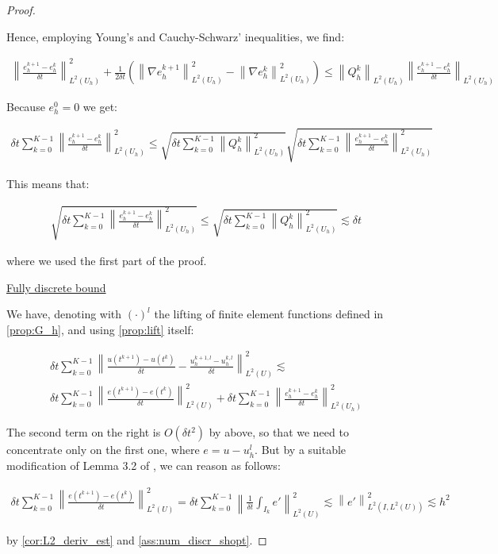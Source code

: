 \documentclass[english,a4paper,9pt,oneside]{scrbook}	%
\theoremstyle{break}
\newenvironment{mproof}[1][\proofname]{%
  \begin{proof}[#1]$ $\par\nobreak\ignorespaces
}{%
  \end{proof}
}
\renewcommand*{\proofname}{Proof}
\theoremstyle{remark}
\newcommand{\norm}[1]{\left\lVert#1\right\rVert}
\begin{document}
\begin{mproof}
Hence, employing Young's and Cauchy-Schwarz' inequalities, we find:

\begin{align*}
\norm{ \frac{e_{h}^{k+1}-e_h^k}{\delta t}}_{L^2(U_h)}^2 + \frac{1}{2\delta t}(\norm{\nabla e_h^{k+1}}^2_{L^2(U_h)} - \norm{\nabla e_h^k}^2_{L^2(U_h)})\leq  \norm{Q_h^k}_{L^2(U_h)} \norm{\frac{e_{h}^{k+1}-e_h^k}{\delta t}}_{L^2(U_h)}
\end{align*}

Because $e_h^0=0$ we get:

\begin{align*}
\delta t \sum_{k=0}^{K-1}\norm{ \frac{e_{h}^{k+1}-e_h^k}{\delta t}}_{L^2(U_h)}^2 \leq  \sqrt{\delta t \sum_{k=0}^{K-1}\norm{Q_h^k}_{L^2(U_h)}^2}\sqrt{\delta t \sum_{k=0}^{K-1} \norm{\frac{e_{h}^{k+1}-e_h^k}{\delta t}}_{L^2(U_h)}^2}
\end{align*}

This means that:

\begin{align*}
\sqrt{\delta t \sum_{k=0}^{K-1} \norm{\frac{e_{h}^{k+1}-e_h^k}{\delta t}}_{L^2(U_h)}^2} \leq  \sqrt{\delta t \sum_{k=0}^{K-1}\norm{Q_h^k}_{L^2(U_h)}^2} \lesssim \delta t
\end{align*}

where we used the first part of the proof.

\underline{Fully discrete bound}

We have, denoting with $(\cdot)^l$ the lifting of finite element functions defined in \cref{prop:G_h}, and using \cref{prop:lift} itself:

\begin{align*}
	\delta t \sum_{k=0}^{K-1} \norm{\frac{u(t^{k+1})-u(t^k)}{\delta t} - \frac{u_h^{k+1,l}-u_h^{k, l}}{\delta t}}_{L^2(U)}^2\lesssim\\
	\delta t \sum_{k=0}^{K-1} \norm{\frac{e(t^{k+1})-e(t^k)}{\delta t}}_{L^2(U)}^2 +  \delta t \sum_{k=0}^{K-1} \norm{\frac{e_h^{k+1}-e_h^{k}}{\delta t}}_{L^2(U_h)}^2
\end{align*}

The second term on the right is $O(\delta t^2)$ by above, so that we need to concentrate only on the first one, where $e=u-u_h^l$. But by a suitable modification of Lemma 3.2 of \cite{lshou}, we can reason as follows:

\begin{align*}
\delta t \sum_{k=0}^{K-1} \norm{\frac{e(t^{k+1})-e(t^k)}{\delta t}}_{L^2(U)}^2 = \delta t \sum_{k=0}^{K-1} \norm{\frac{1}{\delta t}\int_{I_k}e'}_{L^2(U)}^2\lesssim \norm{e'}_{L^2(I,L^2(U))}^2\lesssim h^2
\end{align*}

by \cref{cor:L2_deriv_est} and \cref{ass:num_discr_shopt}.

\end{mproof}
\end{document}

